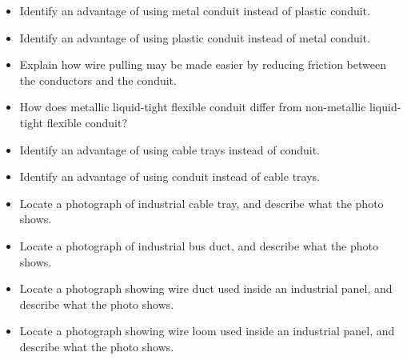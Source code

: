 \begin{itemize}
\item{} Identify an advantage of using metal conduit instead of plastic conduit.
\item{} Identify an advantage of using plastic conduit instead of metal conduit.
\item{} Explain how wire pulling may be made easier by reducing friction between the conductors and the conduit.
\item{} How does metallic liquid-tight flexible conduit differ from non-metallic liquid-tight flexible conduit?
\item{} Identify an advantage of using cable trays instead of conduit.
\item{} Identify an advantage of using conduit instead of cable trays.
\item{} Locate a photograph of industrial cable tray, and describe what the photo shows.
\item{} Locate a photograph of industrial bus duct, and describe what the photo shows.
\item{} Locate a photograph showing wire duct used inside an industrial panel, and describe what the photo shows.
\item{} Locate a photograph showing wire loom used inside an industrial panel, and describe what the photo shows.
\end{itemize}



